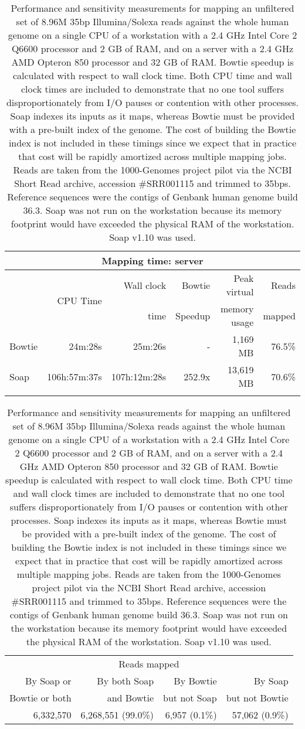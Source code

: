 \documentclass[letterpaper]{article}
\begin{document}
\begin{table}[tp]
\scriptsize
\begin{tabular}{lrrrrr}
\multicolumn{6}{c}{\small{Mapping time: server}} \\[3pt]
\toprule
 & \multirow{2}{*}{CPU Time} & Wall clock & Bowtie  & Peak virtual & Reads  \\
 &                            & time       & Speedup & memory usage & mapped \\[3pt]
\toprule
Bowtie & 24m:28s & 25m:26s & - & 1,169 MB & 76.5\%\\\midrule
Soap & 106h:57m:37s & 107h:12m:28s & 252.9x & 13,619 MB & 70.6\%\\
\bottomrule\\[1pt]
\end{tabular}
\begin{tabular}{rrrr}
\multicolumn{4}{c}{\small{Reads mapped}} \\[3pt] 
By Soap or     & By both Soap & By Bowtie    & By Soap         \\ 
Bowtie or both & and Bowtie   & but not Soap & but not Bowtie \\ 
\toprule
6,332,570 & 6,268,551 (99.0\%) & 6,957 (0.1\%) & 57,062 (0.9\%) \\ 
\bottomrule
\end{tabular}
\caption{Performance and sensitivity measurements for mapping an unfiltered
set of 8.96M 35bp Illumina/Solexa reads
against the whole human genome on a single CPU of a workstation with a 2.4 GHz
Intel Core 2 Q6600 processor and 2 GB of RAM, and on a server with a 2.4 GHz
AMD Opteron 850 processor and 32 GB of RAM. Bowtie speedup is calculated with
respect to wall clock time. Both CPU time and wall clock times are included to
demonstrate that no one tool suffers disproportionately from I/O pauses or
contention with other processes. Soap indexes its inputs
as it maps, whereas Bowtie must be provided with a pre-built index of the
genome.  The cost of building the Bowtie index is not included in these timings
since we expect that in practice that cost will be rapidly amortized across
multiple mapping jobs. Reads are taken from the 1000-Genomes project pilot via
the NCBI Short Read archive, accession \#SRR001115 and trimmed to 35bps.
Reference sequences were the contigs of Genbank human genome build 36.3. Soap
was not run on the workstation because its memory footprint would have exceeded
the physical RAM of the workstation. Soap v1.10 was used. }
\end{table}
\end{document}
